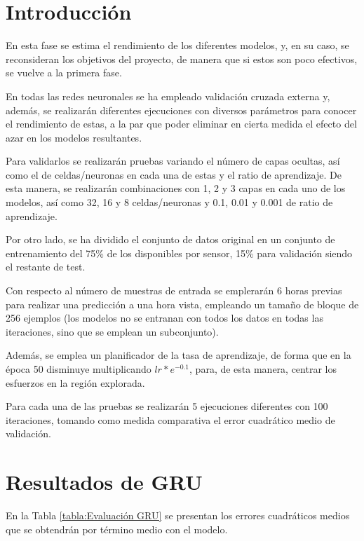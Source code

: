 
\section{Introducción}
En esta fase se estima el rendimiento de los diferentes modelos, y, en su caso, 
se reconsideran los objetivos del proyecto, de manera que si estos son poco efectivos,
se vuelve a la primera fase.

En todas las redes neuronales se ha empleado validación cruzada externa y, además, se realizarán
diferentes ejecuciones con diversos parámetros para conocer el rendimiento de estas, a 
la par que poder eliminar en cierta medida el efecto del azar en los modelos 
resultantes.

Para validarlos se realizarán pruebas variando el número de capas
ocultas, así como el de celdas/neuronas en cada una de estas y el ratio de aprendizaje.
De esta manera, se realizarán combinaciones con 1, 2 y 3 capas en cada uno de los modelos, 
así como 32, 16 y 8 celdas/neuronas y 0.1, 0.01 y 0.001 de ratio de aprendizaje. 

Por otro lado, se ha dividido el conjunto de datos original en un conjunto de entrenamiento del 75\% de los disponibles
por sensor, 15\% para validación siendo el restante de test.

Con respecto al número de muestras de entrada se emplerarán 6 horas previas para realizar
una predicción a una hora vista, empleando un tamaño de bloque de 256 ejemplos (los modelos 
no se entranan con todos los datos en todas las iteraciones, sino que se emplean un subconjunto).

Además, se emplea un planificador de la tasa de aprendizaje, de forma
que en la época 50 disminuye multiplicando \(lr * e^{-0.1}\), para, de esta manera,
centrar los esfuerzos en la región explorada.

Para cada una de las pruebas se realizarán 5 ejecuciones diferentes con 100 iteraciones, 
tomando como medida comparativa el error cuadrático medio de validación.

\section{Resultados de GRU}
En la Tabla \ref{tabla:Evaluación GRU} se presentan los errores cuadráticos medios
que se obtendrán por término medio con el modelo. 

